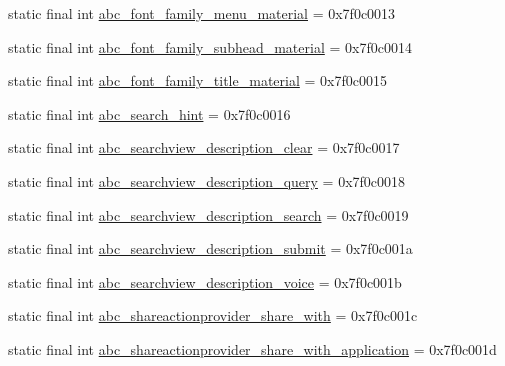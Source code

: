 \begin{DoxyCompactItemize}
\item 
static final int \mbox{\hyperlink{classandroid_1_1support_1_1v7_1_1appcompat_1_1R_1_1string_a430994965ab1d4460b529593cb3f643a}{abc\+\_\+font\+\_\+family\+\_\+menu\+\_\+material}} = 0x7f0c0013
\item 
static final int \mbox{\hyperlink{classandroid_1_1support_1_1v7_1_1appcompat_1_1R_1_1string_aae4ea6c6d51011fffdee7acfc7ddb67a}{abc\+\_\+font\+\_\+family\+\_\+subhead\+\_\+material}} = 0x7f0c0014
\item 
static final int \mbox{\hyperlink{classandroid_1_1support_1_1v7_1_1appcompat_1_1R_1_1string_ada72478e4c0dd08d9a696a9e0b76c55f}{abc\+\_\+font\+\_\+family\+\_\+title\+\_\+material}} = 0x7f0c0015
\item 
static final int \mbox{\hyperlink{classandroid_1_1support_1_1v7_1_1appcompat_1_1R_1_1string_a8a977c43ae9b6036b792a424d60ff3ed}{abc\+\_\+search\+\_\+hint}} = 0x7f0c0016
\item 
static final int \mbox{\hyperlink{classandroid_1_1support_1_1v7_1_1appcompat_1_1R_1_1string_a458a8ba55dea450ed52e936d7fbb4312}{abc\+\_\+searchview\+\_\+description\+\_\+clear}} = 0x7f0c0017
\item 
static final int \mbox{\hyperlink{classandroid_1_1support_1_1v7_1_1appcompat_1_1R_1_1string_a687a6a0f890080c34188b0570f1ad557}{abc\+\_\+searchview\+\_\+description\+\_\+query}} = 0x7f0c0018
\item 
static final int \mbox{\hyperlink{classandroid_1_1support_1_1v7_1_1appcompat_1_1R_1_1string_adb0d54ee3eeb2609de19decfc0831c19}{abc\+\_\+searchview\+\_\+description\+\_\+search}} = 0x7f0c0019
\item 
static final int \mbox{\hyperlink{classandroid_1_1support_1_1v7_1_1appcompat_1_1R_1_1string_ae42251191872922dcd3e42a02b86f36c}{abc\+\_\+searchview\+\_\+description\+\_\+submit}} = 0x7f0c001a
\item 
static final int \mbox{\hyperlink{classandroid_1_1support_1_1v7_1_1appcompat_1_1R_1_1string_af44447786247cf4c993ba7d749a18d7b}{abc\+\_\+searchview\+\_\+description\+\_\+voice}} = 0x7f0c001b
\item 
static final int \mbox{\hyperlink{classandroid_1_1support_1_1v7_1_1appcompat_1_1R_1_1string_ada3024d7f8a977c5a49a8cab63c26f27}{abc\+\_\+shareactionprovider\+\_\+share\+\_\+with}} = 0x7f0c001c
\item 
static final int \mbox{\hyperlink{classandroid_1_1support_1_1v7_1_1appcompat_1_1R_1_1string_acd327651d6f2bbab98396d2967431584}{abc\+\_\+shareactionprovider\+\_\+share\+\_\+with\+\_\+application}} = 0x7f0c001d

\end{DoxyCompactItemize}
